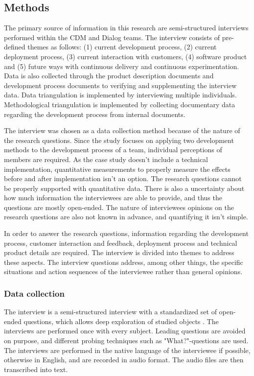 \documentclass[english]{tktltiki2}
\theoremstyle{definition}
\theoremstyle{remark}
\begin{document}
\subsection{Methods} %
The primary source of information in this research are semi-structured interviews \cite{runeson2009guidelines} performed within the CDM and Dialog teams. The interview consists of pre-defined themes as follows: (1) current development process, (2) current deployment process, (3) current interaction with customers, (4) software product and (5) future ways with continuous delivery and continuous experimentation. Data is also collected through the product description documents and development process documents to verifying and supplementing the interview data. Data triangulation is implemented by interviewing multiple individuals. Methodological triangulation is implemented by collecting documentary data regarding the development process from internal documents. 

The interview was chosen as a data collection method because of the nature of the research questions. Since the study focuses on applying two development methods to the development process of a team, individual perceptions of members are required. As the case study doesn't include a technical implementation, quantitative measurements to properly measure the effects before and after implementation isn't an option. The research questions cannot be properly supported with quantitative data. There is also a uncertainty about how much information the interviewees are able to provide, and thus the questions are mostly open-ended. The nature of interviewees opinions on the research questions are also not known in advance, and quantifying it isn't simple. 

In order to answer the research questions, information regarding the development process, customer interaction and feedback, deployment process and technical product details are required. The interview is divided into themes to address these aspects. The interview questions address, among other things, the specific situations and action sequences of the interviewee rather than general opinions. 

\subsubsection{Data collection} %
The interview is a semi-structured interview with a standardized set of open-ended questions, which allows deep exploration of studied objects \cite{runeson2009guidelines}. The interviews are performed once with every subject. Leading questions are avoided on purpose, and different probing techniques such as "What?"-questions are used. The interviews are performed in the native language of the interviewee if possible, otherwise in English, and are recorded in audio format. The audio files are then transcribed into text.
\end{document}
